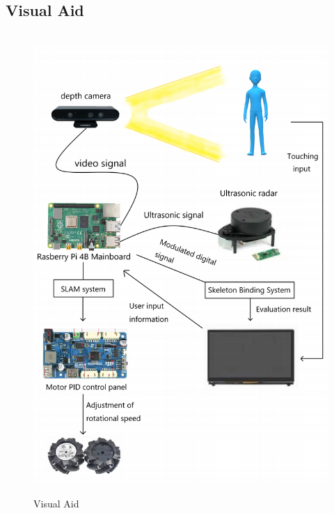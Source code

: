 \subsection{Visual Aid}
\begin{figure}[H]
    \centering
    \includegraphics[width=12cm, height=17.5cm]{sections/Visual.png}
    \caption{Visual Aid}
\end{figure}


